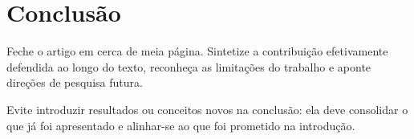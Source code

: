 \section{Conclusão}
\label{sec:conclusao}

Feche o artigo em cerca de meia página. Sintetize a contribuição efetivamente
defendida ao longo do texto, reconheça as limitações do trabalho e aponte
direções de pesquisa futura.

Evite introduzir resultados ou conceitos novos na conclusão: ela deve consolidar
o que já foi apresentado e alinhar-se ao que foi prometido na introdução.
